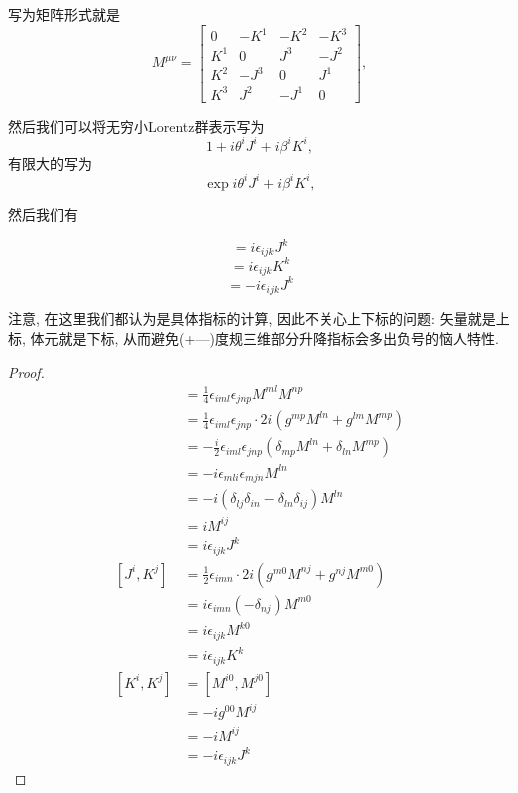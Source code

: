 写为矩阵形式就是
\begin{equation}
    M^{\mu\nu}=\begin{bmatrix}
        0 & -K^1 & -K^2 & -K^3\\
        K^1 & 0 & J^3 & -J^2\\
        K^2 & -J^3 & 0 & J^1\\
        K^3 & J^2 & -J^1 & 0
    \end{bmatrix},
\end{equation}

然后我们可以将无穷小Lorentz群表示写为
\begin{equation}
    1+i\theta^iJ^i+i\beta^iK^i,
\end{equation}
有限大的写为
\begin{equation}
    \exp{i\theta^iJ^i+i\beta^iK^i},
\end{equation}

然后我们有
\begin{theorem}[Lorentz群生成元的对易关系]\label{lorentz-commutator}
    \begin{equation}
        [J^i, J^j]=i\epsilon_{ijk}J^k
    \end{equation}
    \begin{equation}
        [J^i, K^j]=i\epsilon_{ijk}K^k
    \end{equation}
    \begin{equation}
        [K^i, K^j]=-i\epsilon_{ijk}J^k
    \end{equation}
\end{theorem}
注意, 在这里我们都认为是具体指标的计算, 因此不关心上下标的问题: 矢量就是上标, 体元就是下标, 从而避免(+---)度规三维部分升降指标会多出负号的恼人特性.

\begin{proof}
    \begin{align}
        [J^i, J^j]&=\frac14\epsilon_{iml}\epsilon_{jnp}M^{ml}M^{np}\\
        &=\frac14\epsilon_{iml}\epsilon_{jnp}\cdot 2i(g^{mp}M^{ln}+g^{lm}M^{mp})\\
        &=-\frac i2\epsilon_{iml}\epsilon_{jnp}(\delta_{mp}M^{ln}+\delta_{ln}M^{mp})\\
        &=-i\epsilon_{mli}\epsilon_{mjn}M^{ln}\\
        &=-i(\delta_{lj}\delta_{in}-\delta_{ln}\delta_{ij})M^{ln}\\
        &=iM^{ij}\\
        &=i\epsilon_{ijk}J^k\\
        [J^i, K^j]&=\frac12\epsilon_{imn}\cdot2i(g^{m0}M^{nj}+g^{nj}M^{m0})\\
        &=i\epsilon_{imn}(-\delta_{nj})M^{m0}\\
        &=i\epsilon_{ijk}M^{k0}\\
        &=i\epsilon_{ijk}K^k\\
        [K^i, K^j]&=[M^{i0}, M^{j0}]\\
        &=-i g^{00}M^{ij}\\
        &=-iM^{ij}\\
        &=-i\epsilon_{ijk}J^k
    \end{align}
\end{proof}
